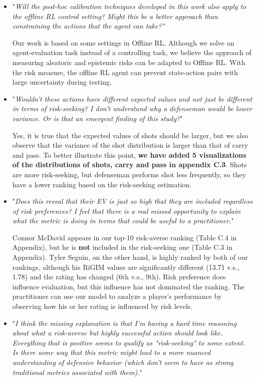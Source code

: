 \documentclass[letterpaper]{article} %
\begin{document}
\begin{itemize}
    \item "{\it Will the post-hoc calibration techniques developed in this work also apply to the offline RL control setting? Might this be a better approach than constraining the actions that the agent can take?"}
    
    Our work is based on some settings in Offline RL. Although we solve an agent-evaluation task instead of a controlling task, we believe the approach of measuring aleatoric and epistemic risks can be adapted to Offline RL. With the risk measure, the offline RL agent can prevent state-action pairs with large uncertainty during testing.
    \medskip
    
    \item "{\it Wouldn't these actions have different expected values and not just be different in terms of risk-seeking? I don't understand why a defenseman would be lower variance. Or is that an emergent finding of this study?}"

    Yes, it is true that the expected values of shots should be larger, but we also observe that the variance of the shot distribution is larger than that of carry and pass. To better illustrate this point, {\bf we have added 5 visualizations of the distributions of shots, carry and pass in appendix C.3}. Shots are more risk-seeking, but defenseman performs shot less frequently, so they have a lower ranking based on the risk-seeking estimation.
    \medskip

    \item "{\it Does this reveal that their EV is just so high that they are included regardless of risk preferences? I feel that there is a real missed opportunity to explain what the metric is doing in terms that could be useful to a practitioner.}"

    Connor McDavid appears in our top-10 risk-averse ranking (Table C.4 in Appendix), but he is {\bf not} included in the risk-seeking one (Table C.3 in Appendix). Tyler Seguin, on the other hand, is highly ranked by both of our rankings, although his RiGIM values are significantly different (13.71 v.s., 1.78) and the rating has changed (6th v.s., 9th). Risk preference does influence evaluation, but this influence has not dominated the ranking. The practitioner can use our model to analyze a player's performance by observing how his or her rating is influenced by risk levels. 
    \medskip

    \item "{\it I think the missing explanation is that I'm having a hard time reasoning about what a risk-averse but highly successful action should look like. Everything that is positive seems to qualify as "risk-seeking" to some extent. Is there some way that this metric might lead to a more nuanced understanding of defensive behavior (which don't seem to have as strong traditional metrics associated with them).}"


\end{itemize}
\end{document}
